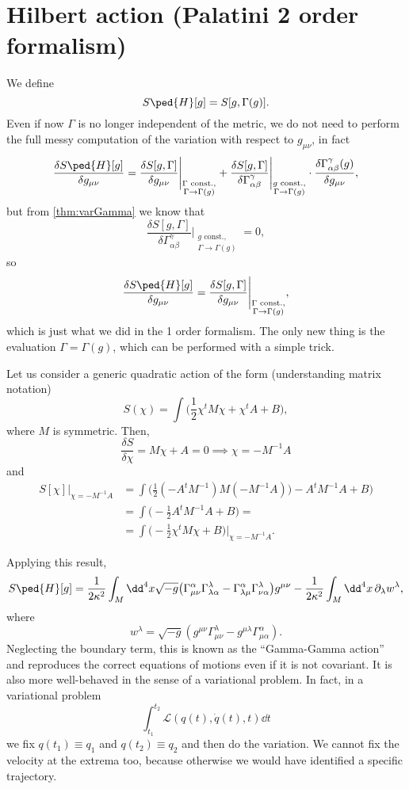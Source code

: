 \documentclass[a4paper,12pt]{book}
\begin{document}
\section{Hilbert action (Palatini 2 order formalism)}
We define
\[S\ped{H}[g]=S[g,\Gamma(g)].\]
Even if now $\Gamma$ is no longer independent of the metric, we do not need to perform the full messy computation of the variation with respect to $g_{\mu\nu}$, in fact
\[\frac{\delta S\ped{H}[g]}{\delta g_{\mu\nu}}=\frac{\delta S[g,\Gamma]}{\delta g_{\mu\nu}}\Bigg|_{\substack{\Gamma\text{ const.},\\ \Gamma\to\Gamma(g)}}+\frac{\delta S[g,\Gamma]}{\delta \Gamma^\gamma_{\alpha\beta}}\Bigg|_{\substack{g\text{ const.},\\ \Gamma\to\Gamma(g)}}\cdot\frac{\delta\Gamma^\gamma_{\alpha\beta}(g)}{\delta g_{\mu\nu}},\]
but from \cref{thm:varGamma} we know that
\[\frac{\delta S[g,\Gamma]}{\delta \Gamma^\gamma_{\alpha\beta}}\Bigg|_{\substack{g\text{ const.},\\ \Gamma\to\Gamma(g)}}=0,\]
so
\[\frac{\delta S\ped{H}[g]}{\delta g_{\mu\nu}}=\frac{\delta S[g,\Gamma]}{\delta g_{\mu\nu}}\Bigg|_{\substack{\Gamma\text{ const.},\\ \Gamma\to\Gamma(g)}},\]
which is just what we did in the 1 order formalism. The only new thing is the evaluation $\Gamma=\Gamma(g)$, which can be performed with a simple trick.

Let us consider a generic quadratic action of the form (understanding matrix notation)
\[S(\chi)=\int\biggl(\frac12\chi^t M\chi+\chi^t A+B\biggr),\]
where $M$ is symmetric. Then,
\[\frac{\delta S}{\delta\chi}=M\chi+A=0\implies \chi=-M^{-1}A\]
and
\begin{align*}
S[\chi]\Big|_{\chi=-M^{-1}A}&=\int\biggl(\frac12(-A^tM^{-1})M(-M^{-1}A))-A^tM^{-1}A+B\biggr)\\
&=\int\biggl(-\frac12A^tM^{-1}A+B\biggr)=\\
&=\int\biggl(-\frac12\chi^tM\chi+B\biggr)\bigg|_{\chi=-M^{-1}A}.
\end{align*}

Applying this result,
\begin{align*}
S\ped{H}[g]=\frac1{2\kappa^2}\int_M\dd^4x\sqrt{-g}\bigl(\Gamma^\alpha_{\mu\nu}\Gamma^\lambda_{\lambda\alpha}-\Gamma^\alpha_{\lambda\mu}\Gamma^\lambda_{\nu\alpha}\bigr)g^{\mu\nu}-\frac1{2\kappa^2}\int_M\dd^4x\,\partial_\lambda w^\lambda,
\end{align*}
where
\[w^\lambda=\sqrt{-g}(g^{\mu\nu}\Gamma^\lambda_{\mu\nu}-g^{\mu\lambda}\Gamma^\alpha_{\mu\alpha}).\]
Neglecting the boundary term, this is known as the ``Gamma-Gamma action'' and reproduces the correct equations of motions even if it is not covariant. It is also more well-behaved in the sense of a variational problem. In fact, in a variational problem
\[\int_{t_1}^{t_2}\mathcal L(q(t),\dot q(t),t)\dd t\]
we fix $q(t_1)\equiv q_1$ and $q(t_2)\equiv q_2$ and then do the variation. We cannot fix the velocity at the extrema too, because otherwise we would have identified a specific trajectory.
\end{document}

